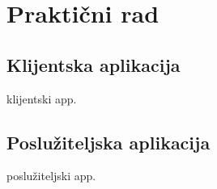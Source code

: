 \chapter{Praktični rad}

\section*{Klijentska aplikacija}
klijentski app.

\section*{Poslužiteljska aplikacija}
poslužiteljski app.